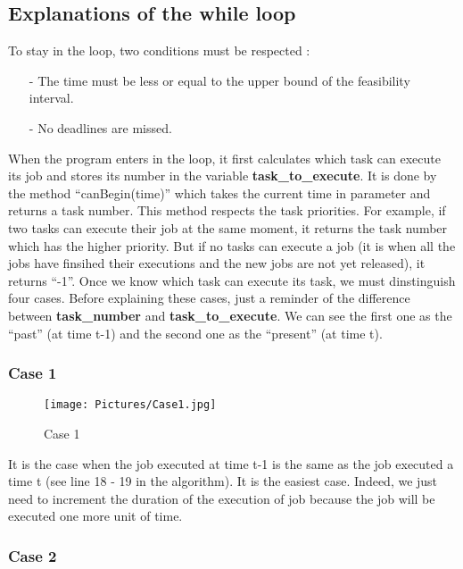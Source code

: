 \documentclass[a4paper,12pt]{article}
\begin{document}
\subsection{Explanations of the while loop}

To stay in the loop, two conditions must be respected : \\
\begin{itemize}
\item[-] The time must be less or equal to the upper bound of the feasibility interval.
\item[-] No deadlines are missed. 
\end{itemize}

\smallskip
\noindent
When the program enters in the loop, it first calculates which task can execute its job and stores its number in the variable \textbf{task\_to\_execute}. It is done by the method ``canBegin(time)'' which takes the current time in parameter and returns a task number. This method respects the task priorities. For example, if two tasks can execute their job at the same moment, it returns the task number which has the higher priority. But if no tasks can execute a job (it is when all the jobs have finsihed their executions and the new jobs are not yet released), it returns ``-1''. Once we know which task can execute its task, we must dinstinguish four cases. Before explaining these cases, just a reminder of the difference between \textbf{task\_number} and \textbf{task\_to\_execute}. We can see the first one as the ``past'' (at time t-1) and the second one as the ``present'' (at time t).

\subsubsection{Case 1}

\begin{figure}[h!]
  \centering
  \texttt{[image: Pictures/Case1.jpg]}
  \caption{Case 1}
  \label{fig: Case 1}
\end{figure}

\smallskip
\noindent
It is the case when the job executed at time t-1 is the same as the job executed a time t (see line 18 - 19 in the algorithm). It is the easiest case. Indeed, we just need to increment the duration of the execution of job because the job will be executed one more unit of time. 


\newpage

\subsubsection{Case 2}
\end{document}
